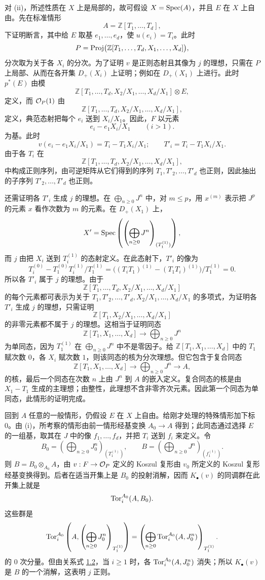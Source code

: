 对 (ii)，所述性质在 \(X\) 上是局部的，故可假设 \(X=\operatorname{Spec}(A)\)，并且 \(E\) 在 \(X\) 上自由。先在标准情形
\[
  A=\mathbb Z[T_1,\ldots,T_d],
\]
下证明断言，其中给 \(E\) 取基 \(e_1,\ldots,e_d\)，使 \(u(e_i)=T_i\)。此时
\[
  P=\operatorname{Proj}\bigl(\mathbb Z[T_1,\ldots,T_d,X_1,\ldots,X_d]\bigr),
\]
分次取为关于各 \(X_i\) 的分次。为了证明 \(v\) 是正则态射且其像为 \(j\) 的理想，只需在 \(P\) 上局部、从而在各开集 \(D_+(X_i)\) 上证明；例如在 \(D_+(X_1)\) 上进行。此时 \(p^*(E)\) 由模
\[
  \mathbb Z[T_1,\ldots,T_d,X_2/X_1,\ldots,X_d/X_1]\otimes E,
\]
定义，而 \(\mathcal O_P(1)\) 由
\[
  \mathbb Z[T_1,\ldots,T_d,X_2/X_1,\ldots,X_d/X_1],
\]
定义，典范态射把每个 \(e_i\) 送到 \(X_i/X_1\)。因此，\(F\) 以元素
\[
  e_i-e_1X_i/X_1\qquad (i>1).
\]
为基。此时
\[
  v(e_i-e_1X_i/X_1)=T_i-T_1X_i/X_1;
  \qquad T'_i=T_i-T_1X_i/X_1.
\]
由于各 \(T_i\) 在
\[
\mathbb Z[T_1,\ldots,T_d,X_2/X_1,\ldots,X_d/X_1],
\]
中构成正则序列，由可逆矩阵从它们得到的序列 \(T_1,T'_2,\ldots,T'_d\) 也正则，因此抽出的子序列 \(T'_2,\ldots,T'_d\) 也正则。

还需证明各 \(T'_i\) 生成 \(j\) 的理想。在 \(\bigoplus_{n\ge0}J^n\) 中，对 \(m\le p\)，用 \(x^{(m)}\) 表示把 \(J^p\) 的元素 \(x\) 看作次数为 \(m\) 的元素。在 \(D_+(X_1)\) 上，
\[
  X'=\operatorname{Spec}\left(\left(\bigoplus_{n\ge0}J^n\right)_{(T_1^{(1)})}\right),
\]
而 \(j\) 由把 \(X_i\) 送到 \(T_i^{(1)}\) 的态射定义。在此态射下，\(T'_i\) 的像为
\[
T_i^{(0)}-T_1^{(0)}T_i^{(1)}/T_1^{(1)}
=\bigl((T_iT_1)^{(1)}-(T_1T_i)^{(1)}\bigr)/T_1^{(1)}=0.
\]
所以各 \(T'_i\) 属于 \(j\) 的理想。由于
\[
\mathbb Z[T_1,\ldots,T_d,X_2/X_1,\ldots,X_d/X_1]
\]
的每个元素都可表示为关于 \(T_1,T'_2,\ldots,T'_d,X_2/X_1,\ldots,X_d/X_1\) 的多项式，为证明各 \(T'_i\) 生成 \(j\) 的理想，只需证明
\[
\mathbb Z[T_1,X_2/X_1,\ldots,X_d/X_1]
\]
的非零元素都不属于 \(j\) 的理想。这相当于证明同态
\[
\mathbb Z[T_1,X_1,\ldots,X_d]\longrightarrow\bigoplus_{n\ge0}J^n
\]
为单同态，因为 \(T_1^{(1)}\) 在 \(\bigoplus_{n\ge0}J^n\) 中不是零因子。给 \(\mathbb Z[T_1,X_1,\ldots,X_d]\) 中的 \(T_1\) 赋次数 \(0\)，各 \(X_i\) 赋次数 \(1\)，则该同态的核为分次理想。但它包含于复合同态
\[
\mathbb Z[T_1,X_1,\ldots,X_d]\longrightarrow
\bigoplus_{n\ge0}J^n\longrightarrow A,
\]
的核，最后一个同态在次数 \(n\) 上由 \(J^n\) 到 \(A\) 的嵌入定义。复合同态的核是由 \(X_1-T_1\) 生成的主理想；由整性，此理想不含非零齐次元素。因此第一个同态为单同态，此情形的证明完成。

回到 \(A\) 任意的一般情形，仍假设 \(E\) 在 \(X\) 上自由。给刚才处理的特殊情形加下标 \(0\)。由 (i)，所考察的情形由前一情形经基变换 \(A_0\to A\) 得到；此同态通过选择 \(E\) 的一组基，取其在 \(J\) 中的像 \(f_1,\ldots,f_d\)，并把 \(T_i\) 送到 \(f_i\) 来定义。令
\[
  B_0=\left(\bigoplus_{n\ge0}J_0^n\right)_{(T_1^{(1)})},\qquad
  B=\left(\bigoplus_{n\ge0}J^n\right)_{(f_1^{(1)})}.
\]
则 \(B=B_0\otimes_{A_0}A\)，由 \(v:F\to\mathcal O_P\) 定义的 Koszul 复形由 \(v_0\) 所定义的 Koszul 复形经基变换得到。后者在适当开集上是 \(B_0\) 的投射消解，因而 \(K_\bullet(v)\) 的同调群在此开集上就是
\[
\operatorname{Tor}_i^{A_0}(A,B_0).
\]
这些群是
\[
\operatorname{Tor}_i^{A_0}\left(A,\left(\bigoplus_{n\ge0}J_0^n\right)_{T_1^{(1)}}\right)
=\left(\bigoplus_{n\ge0}\operatorname{Tor}_i^{A_0}(A,J_0^n)\right)_{T_1^{(1)}}.
\]
的 \(0\) 次分量。但由关系式 \hyperlink{sga6.e07.lem.1-2}{1.2}，当 \(i\ge1\) 时，各 \(\operatorname{Tor}_i^{A_0}(A,J_0^n)\) 消失；所以 \(K_\bullet(v)\) 是 \(B\) 的一个消解，这表明 \(j\) 正则。

